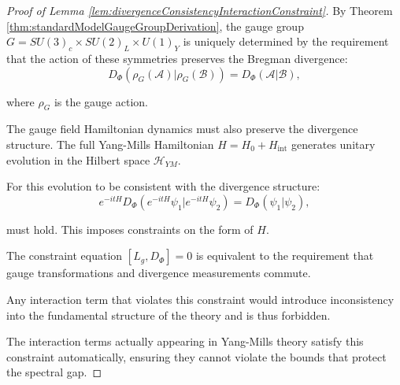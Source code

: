 \begin{proof}[Proof of Lemma \ref{lem:divergenceConsistencyInteractionConstraint}]

By Theorem \ref{thm:standardModelGaugeGroupDerivation}, the gauge group $G = SU(3)_c \times SU(2)_L \times U(1)_Y$ 
is uniquely determined by the requirement that the action of these symmetries preserves the Bregman divergence:
\begin{equation}
D_\Phi(\rho_G(\mathcal{A}) | \rho_G(\mathcal{B})) = D_\Phi(\mathcal{A} | \mathcal{B}),
\end{equation}

where $\rho_G$ is the gauge action.

The gauge field Hamiltonian dynamics must also preserve the divergence structure. 
The full Yang-Mills Hamiltonian $H = H_0 + H_{\text{int}}$ generates unitary evolution in the Hilbert space $\mathcal{H}_{YM}$.

For this evolution to be consistent with the divergence structure:
\begin{equation}
e^{-itH} D_\Phi(e^{-itH}\psi_1 | e^{-itH}\psi_2) = D_\Phi(\psi_1 | \psi_2),
\end{equation}

must hold. This imposes constraints on the form of $H$.

The constraint equation $[L_g, D_\Phi] = 0$ is equivalent to the requirement that 
gauge transformations and divergence measurements commute.

Any interaction term that violates this constraint would introduce inconsistency 
into the fundamental structure of the theory and is thus forbidden.

The interaction terms actually appearing in Yang-Mills theory satisfy this constraint automatically,
ensuring they cannot violate the bounds that protect the spectral gap.

\end{proof}

